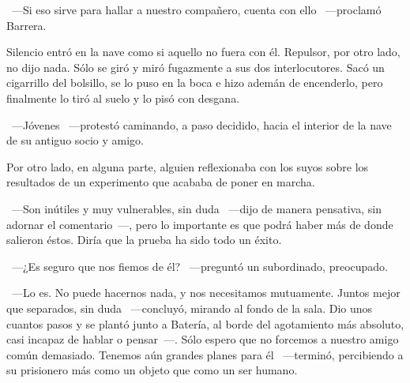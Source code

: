 ~---Si eso sirve para hallar a nuestro compañero, cuenta con ello ~---proclamó Barrera.

Silencio entró en la nave como si aquello no fuera con él. Repulsor, por otro lado, no dijo nada. Sólo se giró y miró fugazmente a sus dos interlocutores. Sacó un cigarrillo del bolsillo, se lo puso en la boca e hizo ademán de encenderlo, pero finalmente lo tiró al suelo y lo pisó con desgana.

~---Jóvenes ~---protestó caminando, a paso decidido, hacia el interior de la nave de su antiguo socio y amigo.

\parbreak
Por otro lado, en alguna parte, alguien reflexionaba con los suyos sobre los resultados de un experimento que acababa de poner en marcha.

~---Son inútiles y muy vulnerables, sin duda ~---dijo de manera pensativa, sin adornar el comentario~---, pero lo importante es que podrá haber más de donde salieron éstos. Diría que la prueba ha sido todo un éxito.

~---¿Es seguro que nos fiemos de él? ~---preguntó un subordinado, preocupado.

~---Lo es. No puede hacernos nada, y nos necesitamos mutuamente. Juntos mejor que separados, sin duda ~---concluyó, mirando al fondo de la sala. Dio unos cuantos pasos y se plantó junto a Batería, al borde del agotamiento más absoluto, casi incapaz de hablar o pensar~---. Sólo espero que no forcemos a nuestro amigo común demasiado. Tenemos aún grandes planes para él ~---terminó, percibiendo a su prisionero más como un objeto que como un ser humano.

